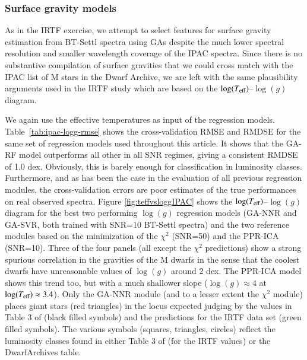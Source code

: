 \subsubsection{Surface gravity models}

As in the IRTF exercise, we attempt to select features for surface
gravity estimation from BT-Settl spectra using GAs despite the much
lower spectral resolution and smaller wavelength coverage of the IPAC
spectra. Since there is no substantive compilation of surface
gravities that we could cross match with the IPAC list of M stars in
the Dwarf Archive, we are left with the same plausibility arguments
used in the IRTF study which are based on the $\log(T_{\rm
  eff})$--$\log(g)$ diagram.

We again use the effective temperatures as input of the regression
models. Table~\ref{tab:ipac-logg-rmse} shows the cross-validation RMSE
and RMDSE for the same set of regression models used throughout this
article. It shows that the GA-RF model outperforms all other in all
SNR regimes, giving a consistent RMDSE of 1.0 dex. Obviously, this is
barely enough for classification in luminosity classes. Furthermore,
and as has been the case in the evaluation of all previous regression
modules, the cross-validation errors are poor estimates of the true
performances on real observed spectra. Figure \ref{fig:teffvsloggIPAC}
shows the $\log(T_{\rm eff})$--$\log(g)$ diagram for the best two
performing $\log(g)$ regression models (GA-NNR and GA-SVR, both
trained with SNR=10 BT-Settl spectra) and the two reference modules
based on the minimization of the $\chi^2$ (SNR=50) and the PPR-ICA
(SNR=10). Three of the four panels (all except the $\chi^2$
predictions) show a strong spurious correlation in the gravities of
the M dwarfs in the sense that the coolest dwarfs have unreasonable
values of $\log(g)$ around 2 dex. The PPR-ICA model shows this trend
too, but with a much shallower slope ($\log(g)\approx 4$ at
$\log(T_{\rm eff})\approx 3.4$). Only the GA-NNR module (and to a
lesser extent the $\chi^2$ module) places giant stars (red triangles)
in the locus expected judging by the values in Table 3
of \cite{cesetti} (black filled symbols) and the predictions for the
IRTF data set (green filled symbols). The various symbols (squares,
triangles, circles) reflect the luminosity classes found in either
Table 3 of \cite{cesetti} (for the IRTF values) or the DwarfArchives
table. 


